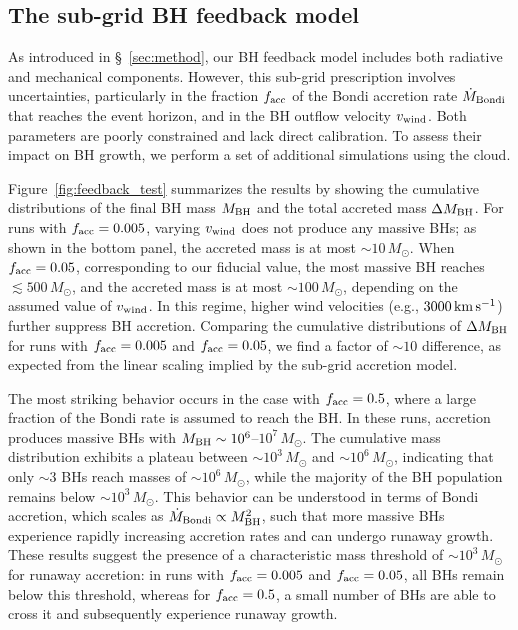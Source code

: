 \documentclass[twocolumn]{aastex631}
\begin{document}
\subsection{The sub-grid BH feedback model}
\label{sec:discussion:feedback_test}

As introduced in \S~\ref{sec:method}, our BH feedback model includes both radiative and mechanical components. However, this sub-grid prescription involves uncertainties, particularly in the fraction $f_{\rm acc}$ of the Bondi accretion rate $\dot M_{\rm Bondi}$ that reaches the event horizon, and in the BH outflow velocity $v_{\rm wind}$. Both parameters are poorly constrained and lack direct calibration. To assess their impact on BH growth, we perform a set of additional simulations using the  cloud.

Figure~\ref{fig:feedback_test} summarizes the results by showing the cumulative distributions of the final BH mass $M_{\rm BH}$ and the total accreted mass $\Delta M_{\rm BH}$. For runs with $f_{\rm acc}=0.005$, varying $v_{\rm wind}$ does not produce any massive BHs; as shown in the bottom panel, the accreted mass is at most $\sim 10\,M_\odot$. When $f_{\rm acc}=0.05$, corresponding to our fiducial value, the most massive BH reaches $\lesssim 500\,M_\odot$, and the accreted mass is at most $\sim 100\,M_\odot$, depending on the assumed value of $v_{\rm wind}$. In this regime, higher wind velocities (e.g., $3000\,\rm km\,s^{-1}$) further suppress BH accretion. Comparing the cumulative distributions of $\Delta M_{\rm BH}$ for runs with $f_{\rm acc}=0.005$ and $f_{\rm acc}=0.05$, we find a factor of $\sim 10$ difference, as expected from the linear scaling implied by the sub-grid accretion model.

The most striking behavior occurs in the case with $f_{\rm acc}=0.5$, where a large fraction of the Bondi rate is assumed to reach the BH. In these runs, accretion produces massive BHs with $M_{\rm BH} \sim 10^6$--$10^7\,M_\odot$. The cumulative mass distribution exhibits a plateau between $\sim 10^3\,M_\odot$ and $\sim 10^6\,M_\odot$, indicating that only $\sim 3$ BHs reach masses of $\sim 10^6\,M_\odot$, while the majority of the BH population remains below $\sim 10^3\,M_\odot$. This behavior can be understood in terms of Bondi accretion, which scales as $\dot M_{\rm Bondi} \propto M_{\rm BH}^2$, such that more massive BHs experience rapidly increasing accretion rates and can undergo runaway growth. These results suggest the presence of a characteristic mass threshold of $\sim 10^3\,M_\odot$ for runaway accretion: in runs with $f_{\rm acc}=0.005$ and $f_{\rm acc}=0.05$, all BHs remain below this threshold, whereas for $f_{\rm acc}=0.5$, a small number of BHs are able to cross it and subsequently experience runaway growth.
\end{document}

